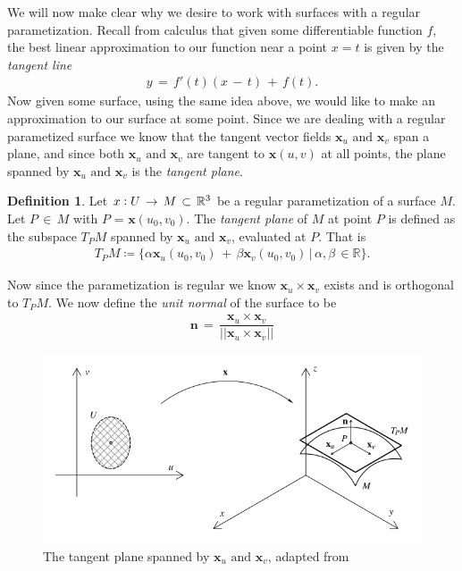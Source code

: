 \documentclass{UKZNcomp}
\newcommand{\vect}[1]{\mathbf{#1}} %
\theoremstyle{definition}
\newtheorem{definition}{Definition}[section]
\theoremstyle{remark}
\begin{document}
We will now make clear why we desire to work with surfaces with a regular parametization. Recall from calculus that given some differentiable function $f$, the best linear approximation to our function near a point $x = t$ is given by the \textit{tangent line}
\begin{align*}
y \, 	= \, f'(t)(	x \, - \, t) \, + \, f(t).
\end{align*}
Now given some surface, using the same idea above, we would like to make an approximation to our surface at some point. Since we are dealing with a regular parametized surface we know that the tangent vector fields $\vect x_u \,\, \text{and}\, \, \vect x_v$ span a plane, and since both $\vect x_u \,\, \text{and} \,\, \vect x_v$ are tangent to $\vect{x}(u,v)$ at all points, the plane spanned by $\vect x_u \,\, \text{and} \,\, \vect x_v$ is the \textit{tangent plane}.

\begin{definition}{}
Let $x \vcentcolon U \, \to \, M \, \subset \, \mathbb{R}^{3}$ be a regular parametization of a surface $M$. Let $P \, \in \, M$ with $P$ = $\vect{x}(u_0,v_0)$. The \textit{tangent plane} of $M$ at point $P$ is defined as the subspace $T_PM$ spanned by $\vect x_u \,\, \text{and} \,\, \vect x_v$, evaluated at $P$. That is 
\begin{align*}
T_PM \coloneqq \{\alpha \vect x_u (u_0,v_0) \, + \, \beta \vect x_v(u_0,v_0)\, |\, \alpha,\beta \, \in \mathbb{R}\}.
\end{align*}
\end{definition}

Now since the parametization is regular we know $\vect x_u \times \vect x_v$ exists and is orthogonal to $T_PM$. We now define the \textit{unit normal} of the surface to be 
\begin{align*}
\vect{n} \, = \, \dfrac{\vect x_u \times \vect x_v}{\lvert\lvert\vect x_u \times \vect x_v\rvert\rvert}
\end{align*}

\begin{figure}[H]
    \centerline{\includegraphics[scale=1]{TangentPlane}}
    \caption[The Tangent Plane]{\label{fig:TangentPlane}
    The tangent plane spanned by $\vect x_u \,\, \text{and} \,\, \vect x_v$, adapted from \cite{Shifrin2016}}
\end{figure}
\end{document}
